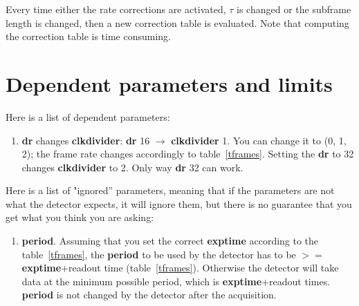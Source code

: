 \documentclass{article}
\begin{document}
Every time either the rate corrections are activated, $\tau$ is changed or the subframe length is changed, then a new correction table is evaluated. Note that computing the correction table is time consuming. 

\section{Dependent parameters and limits}
Here is a list of dependent parameters:
\begin{enumerate}
\item \textbf{dr} changes \textbf{clkdivider}: \textbf{dr} 16 $\to$  \textbf{clkdivider} 1. You can change it to (0, 1, 2); the frame rate changes accordingly to table~\ref{tframes}. Setting the \textbf{dr} to 32 changes \textbf{clkdivider} to 2. Only way  \textbf{dr} 32 can work. 
\end{enumerate}

Here is a list of "ignored'' parameters, meaning that if the parameters are not what the detector expects, it will ignore them, but there is no guarantee that you get what you think you are asking: 
\begin{enumerate}
\item \textbf{period}. Assuming that you set the correct \textbf{exptime} according to the table~\ref{tframes}, the \textbf{period} to be used by the detector has to be $>=$ \textbf{exptime}+readout time (table~\ref{tframes}). Otherwise the detector will take data at the minimum possible period, which is \textbf{exptime}+readout times. \textbf{period} is not changed by the detector after the acquisition. 
\end{enumerate}
\end{document}
